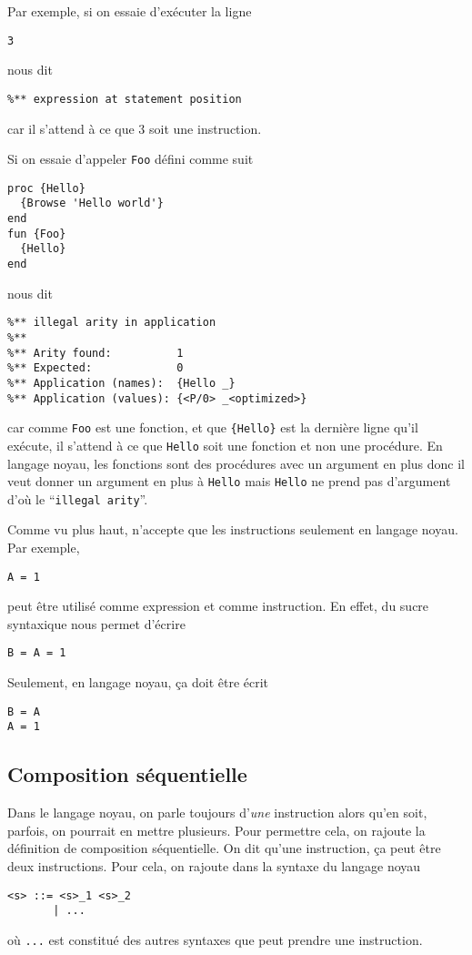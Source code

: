 Par exemple, si on essaie d'exécuter la ligne
\begin{lstlisting}
3
\end{lstlisting}
\oz{} nous dit
\begin{lstlisting}
%** expression at statement position
\end{lstlisting}
car il s'attend à ce que 3 soit une instruction.

Si on essaie d'appeler \lstinline{Foo} défini comme suit
\begin{lstlisting}
proc {Hello}
  {Browse 'Hello world'}
end
fun {Foo}
  {Hello}
end
\end{lstlisting}
\oz{} nous dit
\begin{lstlisting}
%** illegal arity in application
%**
%** Arity found:          1
%** Expected:             0
%** Application (names):  {Hello _}
%** Application (values): {<P/0> _<optimized>}
\end{lstlisting}
car comme \lstinline|Foo| est une fonction,
et que \lstinline|{Hello}| est la dernière ligne qu'il exécute,
il s'attend à ce que \lstinline|Hello| soit une fonction
et non une procédure.
En langage noyau, les fonctions sont des procédures avec un argument
en plus donc il veut donner un argument en plus à \lstinline|Hello|
mais \lstinline{Hello} ne prend pas d'argument d'où le
``\lstinline{illegal arity}''.

Comme vu plus haut,
\oz{} n'accepte que les instructions seulement en langage noyau.
Par exemple,
\begin{lstlisting}
A = 1
\end{lstlisting}
peut être utilisé comme expression et comme instruction.
En effet, du sucre syntaxique nous permet d'écrire
\begin{lstlisting}
B = A = 1
\end{lstlisting}
Seulement, en langage noyau, ça doit être écrit
\begin{lstlisting}
B = A
A = 1
\end{lstlisting}

\subsection{Composition séquentielle}
Dans le langage noyau, on parle toujours d'\emph{une} instruction
alors qu'en soit, parfois, on pourrait en mettre plusieurs.
Pour permettre cela, on rajoute la définition de composition séquentielle.
On dit qu'une instruction, ça peut être deux instructions.
Pour cela, on rajoute dans la syntaxe du langage noyau
\begin{lstlisting}
<s> ::= <s>_1 <s>_2
       | ...
\end{lstlisting}
où \lstinline|...| est constitué des autres syntaxes que peut prendre
une instruction.

